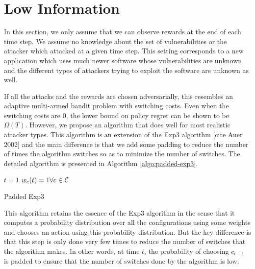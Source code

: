 \section{Low Information}\label{sec:low-info}
In this section, we only assume that we can observe rewards at the end of each time step. We assume no knowledge about the set of vulnerabilities or the attacker which attacked at a given time step. This setting corresponds to a new application which uses much newer software whose vulnerabilities are unknown and the different types of attackers trying to exploit the software are unknown as well.


If all the attacks and the rewards are chosen adversarially, this resembles an adaptive multi-armed bandit problem with switching costs. Even when the switching costs are $0$, the lower bound on policy regret can be shown to be $\Omega(T)$. However, we propose an algorithm that does well for most realistic attacker types. This algorithm is an extension of the Exp3 algorithm [cite Auer 2002] and the main difference is that we add some padding to reduce the number of times the algorithm switches so as to minimize the number of switches. The detailed algorithm is presented in Algorithm \ref{algo:padded-exp3}.

\begin{algorithm}
\DontPrintSemicolon
$t = 1$\;
$w_c(t) = 1 \forall c \in \cal C$\;
\caption{Padded Exp3}
\label{algo:padded-exp3}
\end{algorithm}

This algorithm retains the essence of the Exp3 algorithm in the sense that it computes a probability distribution over all the configurations using some weights and chooses an action using this probability distribution. But the key difference is that this step is only done very few times to reduce the number of switches that the algorithm makes. In other words, at time $t$, the probability of choosing $c_{t-1}$ is padded to ensure that the number of switches done by the algorithm is low.